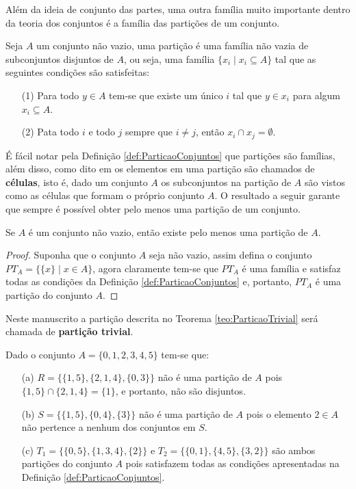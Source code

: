 Além da ideia de conjunto das partes, uma outra família muito importante dentro da teoria dos conjuntos é a família das partições de um conjunto.

\begin{definition}[Partição]\label{def:ParticaoConjuntos}
	Seja $A$ um conjunto não vazio, uma partição é uma família não vazia de subconjuntos disjuntos de $A$, ou seja, uma família $\{x_i \mid x_i \subseteq A\}$ tal que as seguintes condições são satisfeitas:
	\begin{itemize}
		\item[(1)] Para todo $y \in A$ tem-se que existe um único $i$ tal que $y \in x_i$ para algum $x_i \subseteq A$.
		\item[(2)] Pata todo $i$ e todo $j$ sempre que $i \neq j$, então $x_i \cap x_j = \emptyset$.
	\end{itemize}
\end{definition} 

É fácil notar pela Definição   \ref{def:ParticaoConjuntos}  que partições são famílias, além disso, como dito em \cite{lipschutz2013-MD} os elementos em uma partição são chamados de \textbf{células}, isto é, dado um conjunto $A$ os subconjuntos na partição de $A$ são vistos como as células que formam o próprio conjunto $A$. O resultado a seguir garante que sempre é possível obter pelo menos uma partição de um conjunto.

\begin{theorem}\label{teo:ParticaoTrivial}
	Se $A$ é um conjunto não vazio, então existe pelo menos uma partição de $A$.
\end{theorem}

\begin{proof}
	Suponha que o conjunto $A$ seja não vazio, assim defina o conjunto $PT_A = \{\{x\} \mid x \in A\}$, agora claramente tem-se que $PT_A$ é uma família e satisfaz todas as condições da Definição \ref{def:ParticaoConjuntos} e, portanto, $PT_A$ é uma partição do conjunto $A$. 
\end{proof}

\begin{note}
	Neste manuscrito a partição descrita no Teorema \ref{teo:ParticaoTrivial} será chamada de \textbf{partição trivial}. 
\end{note}

\begin{example}
	Dado o conjunto $A = \{0, 1, 2, 3, 4, 5\}$ tem-se que:
	\begin{itemize}
		\item[(a)] $R = \{\{1, 5\}, \{2, 1, 4\}, \{0, 3\}\}$ não é uma partição de $A$ pois $\{1, 5\} \cap \{2, 1, 4\} = \{1\}$, e portanto, não são disjuntos.
		\item[(b)] $S = \{\{1, 5\}, \{0, 4\}, \{3\}\}$ não é uma partição de $A$ pois o elemento $2 \in A$ não pertence a nenhum dos conjuntos em $S$.
		\item[(c)] $T_1 = \{\{0, 5\}, \{1, 3, 4\}, \{2\}\}$ e $T_2 = \{\{0, 1\}, \{4, 5\}, \{3, 2\}\}$ são ambos partições do conjunto $A$ pois satisfazem todas as condições apresentadas na Definição \ref{def:ParticaoConjuntos}.
	\end{itemize}
\end{example}

